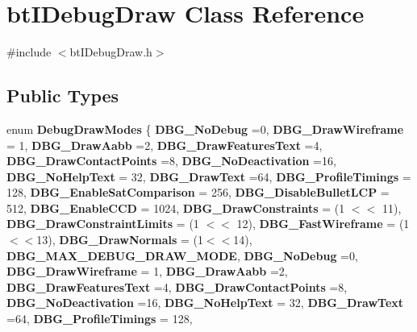 \hypertarget{classbtIDebugDraw}{}\section{bt\+I\+Debug\+Draw Class Reference}
\label{classbtIDebugDraw}


{\ttfamily \#include $<$bt\+I\+Debug\+Draw.\+h$>$}

\subsection*{Public Types}
\begin{DoxyCompactItemize}
\item 
\mbox{\label{classbtIDebugDraw_ab4bb43fbfefb526c552c0943fac5832a}} 
enum {\bfseries Debug\+Draw\+Modes} \{ \newline
{\bfseries D\+B\+G\+\_\+\+No\+Debug} =0, 
{\bfseries D\+B\+G\+\_\+\+Draw\+Wireframe} = 1, 
{\bfseries D\+B\+G\+\_\+\+Draw\+Aabb} =2, 
{\bfseries D\+B\+G\+\_\+\+Draw\+Features\+Text} =4, 
\newline
{\bfseries D\+B\+G\+\_\+\+Draw\+Contact\+Points} =8, 
{\bfseries D\+B\+G\+\_\+\+No\+Deactivation} =16, 
{\bfseries D\+B\+G\+\_\+\+No\+Help\+Text} = 32, 
{\bfseries D\+B\+G\+\_\+\+Draw\+Text} =64, 
\newline
{\bfseries D\+B\+G\+\_\+\+Profile\+Timings} = 128, 
{\bfseries D\+B\+G\+\_\+\+Enable\+Sat\+Comparison} = 256, 
{\bfseries D\+B\+G\+\_\+\+Disable\+Bullet\+L\+CP} = 512, 
{\bfseries D\+B\+G\+\_\+\+Enable\+C\+CD} = 1024, 
\newline
{\bfseries D\+B\+G\+\_\+\+Draw\+Constraints} = (1 $<$$<$ 11), 
{\bfseries D\+B\+G\+\_\+\+Draw\+Constraint\+Limits} = (1 $<$$<$ 12), 
{\bfseries D\+B\+G\+\_\+\+Fast\+Wireframe} = (1$<$$<$13), 
{\bfseries D\+B\+G\+\_\+\+Draw\+Normals} = (1$<$$<$14), 
\newline
{\bfseries D\+B\+G\+\_\+\+M\+A\+X\+\_\+\+D\+E\+B\+U\+G\+\_\+\+D\+R\+A\+W\+\_\+\+M\+O\+DE}, 
{\bfseries D\+B\+G\+\_\+\+No\+Debug} =0, 
{\bfseries D\+B\+G\+\_\+\+Draw\+Wireframe} = 1, 
{\bfseries D\+B\+G\+\_\+\+Draw\+Aabb} =2, 
\newline
{\bfseries D\+B\+G\+\_\+\+Draw\+Features\+Text} =4, 
{\bfseries D\+B\+G\+\_\+\+Draw\+Contact\+Points} =8, 
{\bfseries D\+B\+G\+\_\+\+No\+Deactivation} =16, 
{\bfseries D\+B\+G\+\_\+\+No\+Help\+Text} = 32, 
\newline
{\bfseries D\+B\+G\+\_\+\+Draw\+Text} =64, 
{\bfseries D\+B\+G\+\_\+\+Profile\+Timings} = 128, 

\end{DoxyCompactItemize}
